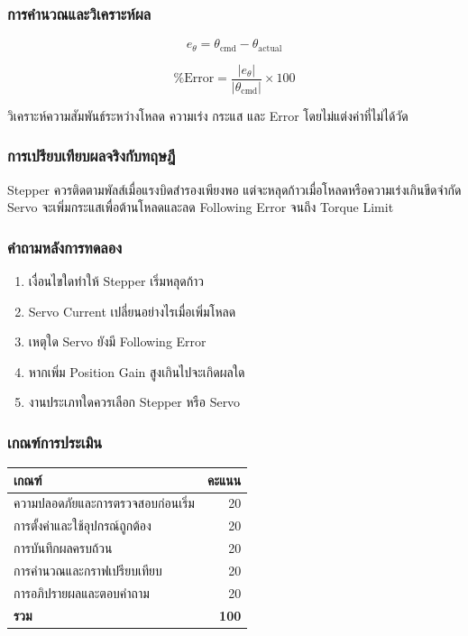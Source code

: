 \subsubsection{การคำนวณและวิเคราะห์ผล}

\[
e_\theta=\theta_{\text{cmd}}-\theta_{\text{actual}}
\]

\[
\%\text{Error}
=
\frac{|e_\theta|}{|\theta_{\text{cmd}}|}\times100
\]

วิเคราะห์ความสัมพันธ์ระหว่างโหลด ความเร่ง กระแส และ Error โดยไม่แต่งค่าที่ไม่ได้วัด

\subsubsection{การเปรียบเทียบผลจริงกับทฤษฎี}

Stepper ควรติดตามพัลส์เมื่อแรงบิดสำรองเพียงพอ แต่จะหลุดก้าวเมื่อโหลดหรือความเร่งเกินขีดจำกัด Servo จะเพิ่มกระแสเพื่อต้านโหลดและลด Following Error จนถึง Torque Limit

\subsubsection{คำถามหลังการทดลอง}

\begin{enumerate}
    \item เงื่อนไขใดทำให้ Stepper เริ่มหลุดก้าว
    \item Servo Current เปลี่ยนอย่างไรเมื่อเพิ่มโหลด
    \item เหตุใด Servo ยังมี Following Error
    \item หากเพิ่ม Position Gain สูงเกินไปจะเกิดผลใด
    \item งานประเภทใดควรเลือก Stepper หรือ Servo
\end{enumerate}

\subsubsection{เกณฑ์การประเมิน}

\begin{table}[htbp]
    \centering
    \begin{tabular}{l r}
        \hline
        \textbf{เกณฑ์} & \textbf{คะแนน} \\
        \hline
        ความปลอดภัยและการตรวจสอบก่อนเริ่ม & 20 \\
        การตั้งค่าและใช้อุปกรณ์ถูกต้อง & 20 \\
        การบันทึกผลครบถ้วน & 20 \\
        การคำนวณและกราฟเปรียบเทียบ & 20 \\
        การอภิปรายผลและตอบคำถาม & 20 \\
        \textbf{รวม} & \textbf{100} \\
        \hline
    \end{tabular}
\end{table}

